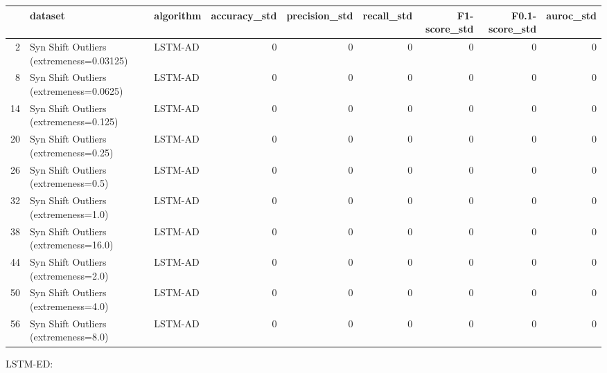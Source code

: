 \begin{tabular}{rllrrrrrr}
\hline
    & dataset                                  & algorithm   &   accuracy\_std &   precision\_std &   recall\_std &   F1-score\_std &   F0.1-score\_std &   auroc\_std \\
\hline
  2 & Syn Shift Outliers (extremeness=0.03125) & LSTM-AD     &              0 &               0 &            0 &              0 &                0 &           0 \\
  8 & Syn Shift Outliers (extremeness=0.0625)  & LSTM-AD     &              0 &               0 &            0 &              0 &                0 &           0 \\
 14 & Syn Shift Outliers (extremeness=0.125)   & LSTM-AD     &              0 &               0 &            0 &              0 &                0 &           0 \\
 20 & Syn Shift Outliers (extremeness=0.25)    & LSTM-AD     &              0 &               0 &            0 &              0 &                0 &           0 \\
 26 & Syn Shift Outliers (extremeness=0.5)     & LSTM-AD     &              0 &               0 &            0 &              0 &                0 &           0 \\
 32 & Syn Shift Outliers (extremeness=1.0)     & LSTM-AD     &              0 &               0 &            0 &              0 &                0 &           0 \\
 38 & Syn Shift Outliers (extremeness=16.0)    & LSTM-AD     &              0 &               0 &            0 &              0 &                0 &           0 \\
 44 & Syn Shift Outliers (extremeness=2.0)     & LSTM-AD     &              0 &               0 &            0 &              0 &                0 &           0 \\
 50 & Syn Shift Outliers (extremeness=4.0)     & LSTM-AD     &              0 &               0 &            0 &              0 &                0 &           0 \\
 56 & Syn Shift Outliers (extremeness=8.0)     & LSTM-AD     &              0 &               0 &            0 &              0 &                0 &           0 \\
\hline
\end{tabular}

LSTM-ED:

